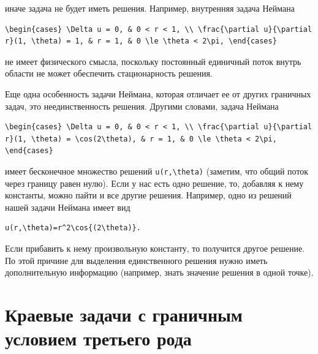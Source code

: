 \documentclass[
  ukrainian,
]{article}
\begin{document}
иначе задача не будет иметь решения. Например, внутренняя задача Неймана

\begin{verbatim}
\begin{cases} \Delta u = 0, & 0 < r < 1, \\ \frac{\partial u}{\partial r}(1, \theta) = 1, & r = 1, & 0 \le \theta < 2\pi, \end{cases}
\end{verbatim}

не имеет физического смысла, поскольку постоянный единичный поток внутрь
области не может обеспечить стационарность решения.

Еще одна особенность задачи Неймана, которая отличает ее от других
граничных задач, это неединственность решения. Другими словами, задача
Неймана

\begin{verbatim}
\begin{cases} \Delta u = 0, & 0 < r < 1, \\ \frac{\partial u}{\partial r}(1, \theta) = \cos(2\theta), & r = 1, & 0 \le \theta < 2\pi, \end{cases}
\end{verbatim}

имеет бесконечное множество решений \texttt{u(r,\textbackslash{}theta)}
(заметим, что общий поток через границу равен нулю). Если у нас есть
одно решение, то, добавляя к нему константы, можно пайти и все другие
решения. Например, одно из решений нашей задачи Неймана имеет вид

\begin{verbatim}
u(r,\theta)=r^2\cos{(2\theta)}.
\end{verbatim}

Если прибавить к нему произвольную константу, то получится другое
решение. По этой причине для выделения единственного решения нужно иметь
дополнительную информацию (например, знать значение решения в одной
точке).

\section{\texorpdfstring{\textbf{Краевые задачи с граничным условием}
третьего
рода}{Краевые задачи с граничным условием третьего рода}}\label{ux43aux440ux430ux435ux432ux44bux435-ux437ux430ux434ux430ux447ux438-ux441-ux433ux440ux430ux43dux438ux447ux43dux44bux43c-ux443ux441ux43bux43eux432ux438ux435ux43c-ux442ux440ux435ux442ux44cux435ux433ux43e-ux440ux43eux434ux430}
\end{document}
